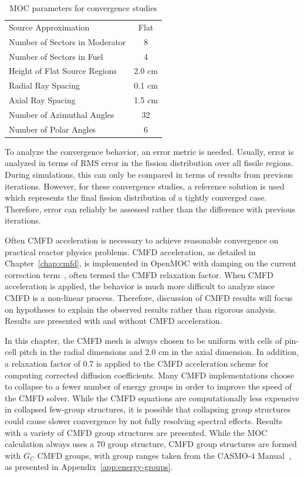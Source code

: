 \begin{table}[ht]
	\centering
	\caption{MOC parameters for convergence studies}
	\medskip
	\begin{tabular}{lc}
		\hline
		Source Approximation & Flat \\
		Number of Sectors in Moderator & 8 \\
		Number of Sectors in Fuel & 4 \\
		Height of Flat Source Regions & 2.0 cm \\
		Radial Ray Spacing & 0.1 cm \\
		Axial Ray Spacing & 1.5 cm \\
		Number of Azimuthal Angles & 32 \\
		Number of Polar Angles & 6 \\
		\hline
	\end{tabular}
	\label{tab:convergence-tests-params}
\end{table}

To analyze the convergence behavior, an error metric is needed. Usually, error is analyzed in terms of \ac{RMS} error in the fission distribution over all fissile regions. During simulations, this can only be compared in terms of results from previous iterations. However, for these convergence studies, a reference solution is used which represents the final fission distribution of a tightly converged case. Therefore, error can reliably be assessed rather than the difference with previous iterations.

Often \ac{CMFD} acceleration is necessary to achieve reasonable convergence on practical reactor physics problems. \ac{CMFD} acceleration, as detailed in Chapter~\ref{chap:cmfd}, is implemented in OpenMOC with damping on the current correction term~\cite{smith2002casmo}, often termed the \ac{CMFD} relaxation factor. When \ac{CMFD} acceleration is applied, the behavior is much more difficult to analyze since \ac{CMFD} is a non-linear process. Therefore, discussion of \ac{CMFD} results will focus on hypotheses to explain the observed results rather than rigorous analysis. Results are presented with and without \ac{CMFD} acceleration.

In this chapter, the \ac{CMFD} mesh is always chosen to be uniform with cells of pin-cell pitch in the radial dimensions and 2.0 cm in the axial dimension. In addition, a relaxation factor of 0.7 is applied to the \ac{CMFD} acceleration scheme for computing corrected diffusion coefficients. Many \ac{CMFD} implementations choose to collapse to a fewer number of energy groups in order to improve the speed of the \ac{CMFD} solver. While the \ac{CMFD} equations are computationally less expensive in collapsed few-group structures, it is possible that collapsing group structures could cause slower convergence by not fully resolving spectral effects. Results with a variety of \ac{CMFD} group structures are presented. While the \ac{MOC} calculation always uses a 70 group structure, \ac{CMFD} group structures are formed with $G_C$ \ac{CMFD} groups, with group ranges taken from the CASMO-4 Manual~\cite{edenius1995casmo}, as presented in Appendix~\ref{app:energy-groups}.

